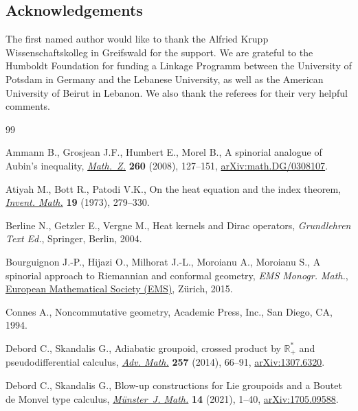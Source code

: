\documentclass[pdftex]{sigma}
\numberwithin{equation}{section}
\theoremstyle{definition}
\begin{document}
\subsection*{Acknowledgements} The first named author would like to thank the Alfried Krupp Wissenschaftskolleg in Greifswald for the support. We are grateful to the Humboldt Foundation for funding a Linkage Programm between the University of Potsdam in Germany and the Lebanese University, as well as the American University of Beirut in Lebanon. We also thank the referees for their very helpful comments.

\begin{thebibliography}{99}
\footnotesize\itemsep=0pt

Ammann B., Grosjean J.F., Humbert E., Morel B., A spinorial analogue of
 {A}ubin's inequality, \href{https://doi.org/10.1007/s00209-007-0266-5}{\textit{Math.~Z.}} \textbf{260} (2008), 127--151,
 \href{https://arxiv.org/abs/math.DG/0308107}{arXiv:math.DG/0308107}.

Atiyah M., Bott R., Patodi V.K., On the heat equation and the index theorem,
 \href{https://doi.org/10.1007/BF01425417}{\textit{Invent. Math.}} \textbf{19} (1973), 279--330.

Berline N., Getzler E., Vergne M., Heat kernels and {D}irac operators,
 \textit{Grundlehren Text Ed.}, Springer, Berlin, 2004.

Bourguignon J.-P., Hijazi O., Milhorat J.-L., Moroianu A., Moroianu S., A
 spinorial approach to {R}iemannian and conformal geometry, \textit{EMS Monogr. Math.},
 \href{https://doi.org/10.4171/136}{European Mathematical Society (EMS)}, Z\"urich, 2015.

Connes A., Noncommutative geometry, Academic Press, Inc., San Diego, CA, 1994.

Debord C., Skandalis G., Adiabatic groupoid, crossed product by
 {$\mathbb{R}_+^\ast$} and pseudodifferential calculus, \href{https://doi.org/10.1016/j.aim.2014.02.012}{\textit{Adv. Math.}}
 \textbf{257} (2014), 66--91, \href{https://arxiv.org/abs/1307.6320}{arXiv:1307.6320}.

Debord C., Skandalis G., Blow-up constructions for {L}ie groupoids and a
 {B}outet de {M}onvel type calculus, \href{https://doi.org/10.17879/59019640550}{\textit{M\"unster~J. Math.}} \textbf{14}
 (2021), 1--40, \href{https://arxiv.org/abs/1705.09588}{arXiv:1705.09588}.


\end{thebibliography}
\end{document}
